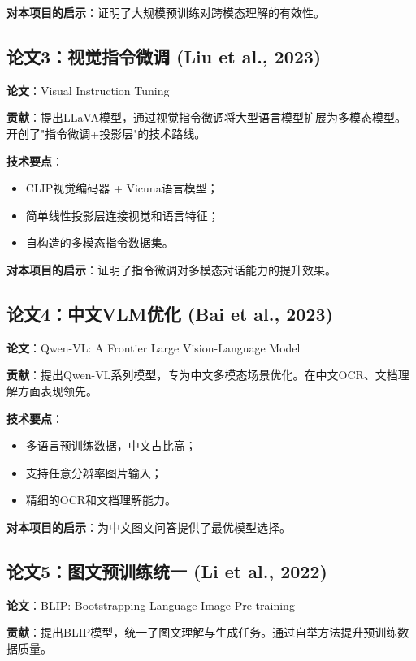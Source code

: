 \textbf{对本项目的启示}：证明了大规模预训练对跨模态理解的有效性。

\subsection{论文3：视觉指令微调 (Liu et al., 2023)}

\textbf{论文}：Visual Instruction Tuning\cite{liu2023llava}

\textbf{贡献}：提出LLaVA模型，通过视觉指令微调将大型语言模型扩展为多模态模型。开创了"指令微调+投影层"的技术路线。

\textbf{技术要点}：
\begin{itemize}
  \item CLIP视觉编码器 + Vicuna语言模型；
  \item 简单线性投影层连接视觉和语言特征；
  \item 自构造的多模态指令数据集。
\end{itemize}

\textbf{对本项目的启示}：证明了指令微调对多模态对话能力的提升效果。

\subsection{论文4：中文VLM优化 (Bai et al., 2023)}

\textbf{论文}：Qwen-VL: A Frontier Large Vision-Language Model\cite{bai2023qwen}

\textbf{贡献}：提出Qwen-VL系列模型，专为中文多模态场景优化。在中文OCR、文档理解方面表现领先。

\textbf{技术要点}：
\begin{itemize}
  \item 多语言预训练数据，中文占比高；
  \item 支持任意分辨率图片输入；
  \item 精细的OCR和文档理解能力。
\end{itemize}

\textbf{对本项目的启示}：为中文图文问答提供了最优模型选择。

\subsection{论文5：图文预训练统一 (Li et al., 2022)}

\textbf{论文}：BLIP: Bootstrapping Language-Image Pre-training\cite{li2022blip}

\textbf{贡献}：提出BLIP模型，统一了图文理解与生成任务。通过自举方法提升预训练数据质量。

